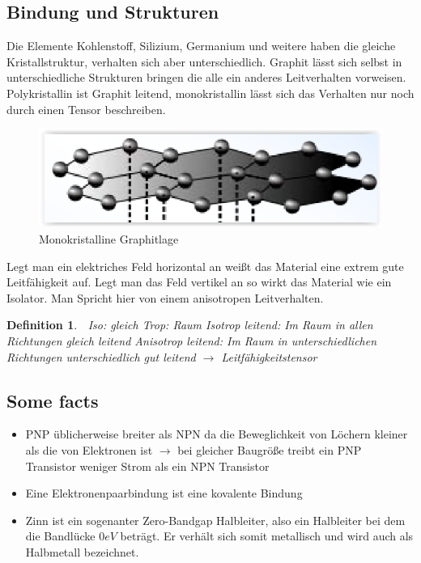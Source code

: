 \documentclass[12pt,a4paper]{report}%
\newtheorem{definition}[satz]{Definition}
\numberwithin{equation}{section}
\numberwithin{equation}{subsection}
\begin{document}
  \subsection{Bindung und Strukturen}
  Die Elemente Kohlenstoff, Silizium, Germanium und weitere haben die gleiche Kristallstruktur, verhalten sich aber unterschiedlich. Graphit lässt sich selbst in unterschiedliche Strukturen bringen die alle ein anderes Leitverhalten vorweisen. Polykristallin ist Graphit leitend, monokristallin lässt sich das Verhalten nur noch durch einen Tensor beschreiben. 
   \begin{figure}[H] 
	  \centering
	  \captionsetup{justification=centering}
	  \includegraphics[width=0.6\linewidth]{graphen_b.png}
	  \caption{Monokristalline Graphitlage \protect\cite{MIKRO2}}
	  \label{fig:graphen_a}
  \end{figure}
  Legt man ein elektriches Feld horizontal an weißt das Material eine extrem gute Leitfähigkeit auf. Legt man das Feld vertikel an so wirkt das Material wie ein Isolator.
  Man Spricht hier von einem anisotropen Leitverhalten.
  \begin{definition}$\;$ \newline
    Iso: gleich \newline
    Trop: Raum \newline
    Isotrop leitend: Im Raum in allen Richtungen gleich leitend\newline
    Anisotrop leitend: Im Raum in unterschiedlichen Richtungen unterschiedlich gut leitend $\rightarrow$ Leitfähigkeitstensor
  \end{definition}
  
  \subsection{Some facts}
  \begin{itemize}
    \item PNP üblicherweise breiter als NPN da die Beweglichkeit von Löchern kleiner als die von Elektronen ist\newline
    $\rightarrow$ bei gleicher Baugröße treibt ein PNP Transistor weniger Strom als ein NPN Transistor
    \item Eine Elektronenpaarbindung ist eine kovalente Bindung
    \item Zinn ist ein sogenanter Zero-Bandgap Halbleiter, also ein Halbleiter bei dem die Bandlücke $0eV$ beträgt. Er verhält sich somit metallisch und wird auch als Halbmetall bezeichnet.
  \end{itemize}
\newpage
\end{document}
